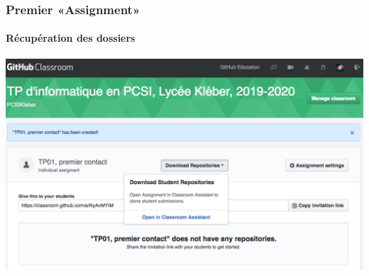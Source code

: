 \begin{frame}
	\frametitle{Premier «Assignment»}
	\framesubtitle{Récupération des dossiers}

	\begin{center}
		\includegraphics[width=\linewidth]{figures/classroom_assignment_suivi.png}
	\end{center}

\end{frame}
